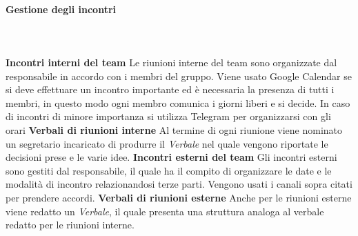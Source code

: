 			\paragraph{Gestione degli incontri} \mbox{}\\ \mbox{}\\
			\textbf{Incontri interni del team} \newline \newline
			Le riunioni interne del team sono organizzate dal responsabile in accordo con i membri del gruppo. Viene usato Google Calendar se si deve effettuare un incontro importante ed è necessaria la presenza di tutti i membri, in questo modo ogni membro comunica i giorni liberi e si decide. In caso di incontri di minore importanza si utilizza Telegram per organizzarsi con gli orari \newline \newline
			\textbf{Verbali di riunioni interne} \newline \newline
			Al termine di ogni riunione viene nominato un segretario incaricato di produrre il \textit{Verbale} nel quale vengono riportate le decisioni prese e le varie idee. \newline \newline
			\textbf{Incontri esterni del team} \newline \newline
			Gli incontri esterni sono gestiti dal responsabile, il quale ha il compito di organizzare le date e le modalità di incontro relazionandosi terze parti. Vengono usati i canali sopra citati per prendere accordi.
			\newline \newline
			\textbf{Verbali di riunioni esterne} \newline \newline
			Anche per le riunioni esterne viene redatto un \textit{Verbale}, il quale presenta una struttura analoga al verbale redatto per le riunioni interne.  

